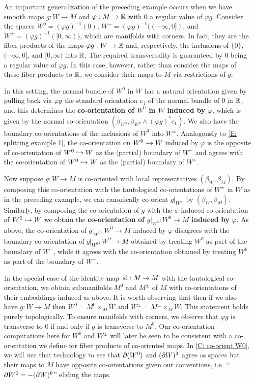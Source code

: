 \begin{example}\label{E: manifold decomposition}
	An important generalization of the preceding example occurs when we have smooth maps $g:W\to M$ and $\varphi:M\to \mathbb{R}$ with $0$ a regular value of $\varphi g$.
	Consider the spaces $W^0=(\varphi g)^{-1}(0)$, $W^-=(\varphi g)^{-1}((-\infty,0])$, and $W^+=(\varphi g)^{-1}([0,\infty))$, which are manifolds with corners.
	In fact, they are the fiber products of the maps $\varphi g:W\to \mathbb{R}$ and, respectively, the inclusions of $\{0\}$, $(-\infty, 0]$, and $[0,\infty)$ into $\mathbb{R}$.
	The required transversality is guaranteed by $0$ being a regular value of $\varphi g$.
	In this case, however, rather than consider the maps of these fiber products to $\mathbb{R}$, we consider their maps to $M$ via restrictions of $g$.

	In this setting, the normal bundle of $W^0$ in $W$ has a natural orientation given by pulling back via $\varphi g$ the standard orientation $e_1$ of the normal bundle of $0$ in $\mathbb{R}$, and this determines the \textbf{co-orientation of $W^0$ in $W$ induced by $\varphi$}, which is given by the normal co-orientation $(\beta_{W^0}, \beta_{W^0} \wedge(\varphi g)^*e_1)$.
	We also have the boundary co-orientations of the inclusions of $W^0$ into $W^{\pm}$.
	Analogously to \cref{E: splitting example 1}, the co-orientation on $W^0\hookrightarrow W$ induced by $\varphi$ is the opposite of co-orientation of $W^0\hookrightarrow W$ as the (partial) boundary of $W^-$ and agrees with the co-orientation of $W^0\hookrightarrow W$ as the (partial) boundary of $W^+$.

	Now suppose $g:W\to M$ is co-oriented with local representatives $(\beta_W,\beta_M)$.
	By composing this co-orientation with the tautological co-orientations of $W^\pm$ in $W$ as in the preceding example, we can canonically co-orient $g|_{W^\pm}$ by $(\beta_W,\beta_M)$.
	Similarly, by composing the co-orientation of $g$ with the $\phi$-induced co-orientation of $W^0\hookrightarrow W$ we obtain the \textbf{co-orientation of $g|_{W^0}:W^0\to M$ induced by $\varphi$}.
	As above, the co-orientation of $g|_{W^0}:W^0\to M$ induced by $\varphi$ disagrees with the boundary co-orientation of $g|_{W^0}:W^0\to M$ obtained by treating $W^0$ as part of the boundary of $W^-$, while it agrees with the co-orientation obtained by treating $W^0$ as part of the boundary of $W^+$.

	In the special case of the identity map $\mathrm{id}:M\to M$ with the tautological co-orientation, we obtain submanifolds $M^0$ and $M^{\pm}$ of $M$ with co-orientations of their embeddings induced as above.
	It is worth observing that then if we also have $g:W\to M$ then $W^0=M^0\times_M W$ and $W^{\pm}=M^{\pm}\times_M W$.
	This statement holds purely topologically.
	To ensure manifolds with corners, we observe that $\varphi g$ is transverse to $0$ if and only if $g$ is transverse to $M^0$.
	Our co-orientation computations here for $W^0$ and $W^\pm$ will later be seen to be consistent with a co-orientation we define for fiber products of co-oriented maps.
	In \cref{C: co-orient W0}, we will use that technology to see that $\partial (W^0)$ and $(\partial W)^0$ agree as spaces but their maps to $M$ have opposite co-orientations given our conventions, i.e.\ ``$\partial W^0=-(\partial W)^0$'' eliding the maps.
\end{example}
